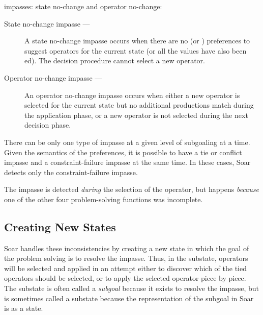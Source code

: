 \begin{description}
        impasses: state no-change and operator no-change:\vspace{-8pt} 
        \begin{description}
        \item[State no-change impasse ---] 
		A state no-change impasse occurs when there are no
		 (or ) preferences to suggest
		operators for the current state (or all the 
		values have also been ed). The decision procedure
		cannot select a new operator.\vspace{-8pt}
        \item[Operator no-change impasse ---] 
		An operator no-change impasse occurs when either a new operator 
                is selected for the current state but no additional productions
                match during the application phase, or a new
                operator is not selected during the next decision phase.
        \end{description}
\end{description}

There can be only one type of impasse at a given level of subgoaling at
a time. Given the semantics of the preferences, it is possible to have a
tie or conflict impasse and a constraint-failure impasse at the same
time.  In these cases, Soar detects only the constraint-failure impasse.

The impasse is detected \textit{during} the selection of the operator,
but happens \textit{because} one of the other four problem-solving
functions was incomplete.

\subsection{Creating New States}
Soar handles these inconsistencies by creating a new state in which the
goal of the problem solving is to resolve the impasse.  Thus, in the
substate, operators will be selected and applied in an attempt either to
discover which of the tied operators should be selected, or to apply the
selected operator piece by piece.  The substate is often called a
\emph{subgoal} because it exists to resolve the impasse, but is
sometimes called a substate because the representation of the subgoal in
Soar is as a state.

